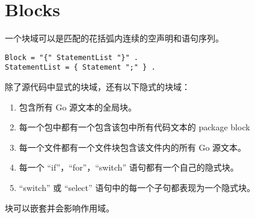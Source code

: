 \chapter{Blocks}
一个块域可以是匹配的花括弧内连续的空声明和语句序列。
\begin{lstlisting}[style=EBNF]
Block = "{" StatementList "}" .
StatementList = { Statement ";" } .
\end{lstlisting}

除了源代码中显式的块域，还有以下隐式的块域：
\begin{enumerate}
\item 包含所有 Go 源文本的全局块。
\item 每一个包中都有一个包含该包中所有代码文本的 package block
\item 每一个文件都有一个文件块包含该文件内的所有 Go 源文本。
\item 每一个 ``if''，``for''，``switch'' 语句都有一个自己的隐式块。
\item  ``switch'' 或 ``select'' 语句中的每一个子句都表现为一个隐式块。
\end{enumerate}
块可以嵌套并会影响作用域。